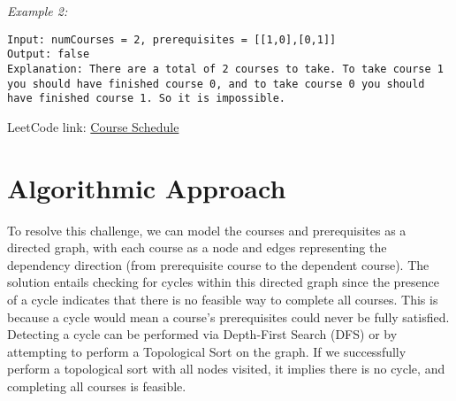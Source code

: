 \textit{Example 2:}
\begin{verbatim}
Input: numCourses = 2, prerequisites = [[1,0],[0,1]]
Output: false
Explanation: There are a total of 2 courses to take. To take course 1 you should have finished course 0, and to take course 0 you should have finished course 1. So it is impossible.
\end{verbatim}

LeetCode link: \href{https://leetcode.com/problems/course-schedule/}{Course Schedule}


\section*{Algorithmic Approach}

To resolve this challenge, we can model the courses and prerequisites as a directed graph, with each course as a node and edges representing the dependency direction (from prerequisite course to the dependent course). The solution entails checking for cycles within this directed graph since the presence of a cycle indicates that there is no feasible way to complete all courses. This is because a cycle would mean a course's prerequisites could never be fully satisfied. Detecting a cycle can be performed via Depth-First Search (DFS) or by attempting to perform a Topological Sort on the graph. If we successfully perform a topological sort with all nodes visited, it implies there is no cycle, and completing all courses is feasible.


